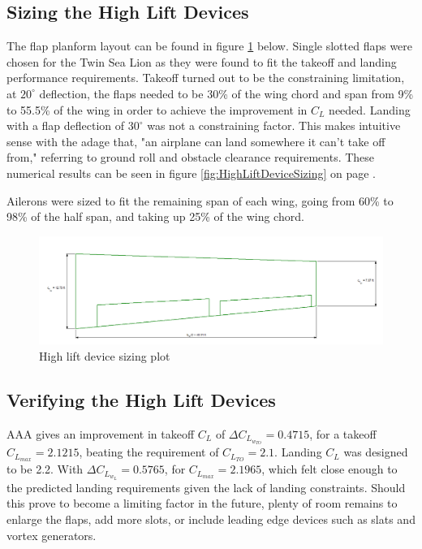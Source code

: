 \documentclass[conf]{new-aiaa}
\begin{document}
\subsection{Sizing the High Lift Devices}
The flap planform layout can be found in figure \ref{fig:HighLiftDeviceSizingPlot} below. Single slotted flaps were chosen for the Twin Sea Lion as they were found to fit the takeoff and landing performance requirements. Takeoff turned out to be the constraining limitation, at $20^\circ$ deflection, the flaps needed to be 30\% of the wing chord and span from 9\% to 55.5\% of the wing in order to achieve the improvement in $C_L$ needed. Landing with a flap deflection of $30^\circ$ was not a constraining factor. This makes intuitive sense with the adage that, "an airplane can land somewhere it can't take off from," referring to ground roll and obstacle clearance requirements. These numerical results can be seen in figure \ref{fig:HighLiftDeviceSizing} on page \pageref{fig:HighLiftDeviceSizing}.

Ailerons were sized to fit the remaining span of each wing, going from 60\% to 98\% of the half span, and taking up 25\% of the wing chord.

\begin{figure}[H]
	\centering
	\includegraphics[width=\textwidth]{TwinSeaLionReport2Printouts/HighLiftDeviceSizingPlot}
	\caption{High lift device sizing plot}
	\label{fig:HighLiftDeviceSizingPlot}
\end{figure}

\subsection{Verifying the High Lift Devices}
AAA gives an improvement in takeoff $C_L$ of $\Delta C_{L_{w_{TO}}} = 0.4715$, for a takeoff $C_{L_{max}} = 2.1215$, beating the requirement of $C_{L_{TO}} = 2.1$. Landing $C_L$ was designed to be 2.2. With $\Delta C_{L_{w_{L}}} = 0.5765$, for $C_{L_{max}} = 2.1965$, which felt close enough to the predicted landing requirements given the lack of landing constraints. Should this prove to become a limiting factor in the future, plenty of room remains to enlarge the flaps, add more slots, or include leading edge devices such as slats and vortex generators.
\end{document}

